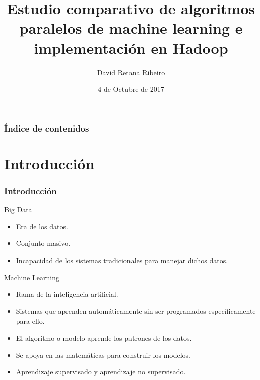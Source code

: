 \documentclass{beamer}
\title[Machine Learning y Big Data]
      {Estudio comparativo de algoritmos paralelos de machine learning e implementación en Hadoop}
\author{David Retana Ribeiro}
\institute[UCM]{Universidad Complutense de Madrid \\ \medskip \texttt{davidret@ucm.es}}
\date{4 de Octubre de 2017}
\begin{document}

\begin{frame} %
\titlepage
\end{frame}


\begin{frame} %
\frametitle{Índice de contenidos}
\tableofcontents
\end{frame}


\section{Introducción}

\begin{frame} %
  \frametitle{Introducción}
  \begin{block}{Big Data}
  \begin{itemize}
    \item Era de los datos.
    \item Conjunto masivo.
    \item Incapacidad de los sistemas tradicionales para manejar dichos datos.
  \end{itemize}
  \end{block}
  
  \begin{block}{Machine Learning}
  \begin{itemize}
    \item Rama de la inteligencia artificial.
    \item Sistemas que aprenden automáticamente sin ser programados específicamente para ello.
    \item El algoritmo o modelo aprende los patrones de los datos.
    \item Se apoya en las matemáticas para construir los modelos.
    \item Aprendizaje supervisado y aprendizaje no supervisado.
  \end{itemize}
  \end{block}
\end{frame}
\end{document}
